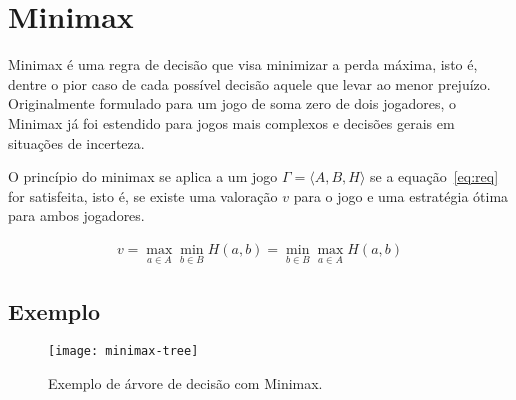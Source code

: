 \chapter{Minimax}

Minimax é uma regra de decisão que visa minimizar a perda máxima, isto é, dentre
o pior caso de cada possível decisão aquele que levar ao menor prejuízo.
Originalmente formulado para um jogo de soma zero de dois jogadores, o Minimax
já foi estendido para jogos mais complexos e decisões gerais em situações de
incerteza.

O princípio do minimax se aplica a um jogo $\Gamma=\langle A,B,H\rangle$ se a
equação~\ref{eq:req} for satisfeita, isto é, se existe uma valoração $v$ para o
jogo e uma estratégia ótima para ambos jogadores.
\cite{hazewinkel2002encyclopaedia}

\begin{gather}
  v=\max_{a\in A}\min_{b\in B}H(a,b)=\min_{b\in B}\max_{a\in A}H(a,b)\label{eq:req}
\end{gather}

\section{Exemplo}

\begin{figure}[ht]
  \centering
  \texttt{[image: minimax-tree]}
  \caption{Exemplo de árvore de decisão com Minimax.}\label{minimax-tree}
\end{figure}

